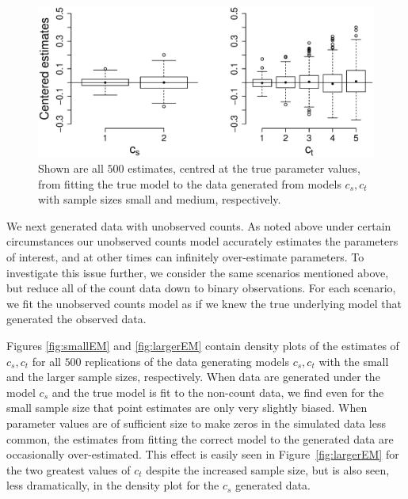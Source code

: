\documentclass[smallextended]{svjour3}
\begin{document}
\begin{figure}
  \centering
  \includegraphics[scale=0.5]{bp}
  \caption{Shown are all $500$ estimates, centred at the true parameter values, from fitting the true model to the data generated from models $c_s,c_t$ with sample sizes small and medium, respectively.}
  \label{fig:bp}
\end{figure}

We next generated data with unobserved counts.  As noted above under certain circumstances our unobserved counts model accurately estimates the parameters of interest, and at other times can infinitely over-estimate parameters.  To investigate this issue further, we consider the same scenarios mentioned above, but reduce all of the count data down to binary observations.  For each scenario, we fit the unobserved counts model as if we knew the true underlying model that generated the observed data.

Figures \ref{fig:smallEM} and \ref{fig:largerEM} contain density plots of the estimates of $c_s, c_t$ for all $500$ replications of the data generating models $c_s,c_t$ with the small and the larger sample sizes, respectively.  When data are generated under the model $c_s$ and the true model is fit to the non-count data, we find even for the small sample size that point estimates are only very slightly biased.  When parameter values are of sufficient size to make zeros in the simulated data less common, the estimates from fitting the correct model to the generated data are occasionally over-estimated.  This effect is easily seen in Figure~\ref{fig:largerEM} for the two greatest values of $c_t$ despite the increased sample size, but is also seen, less dramatically, in the density plot for the $c_s$ generated data.  
\end{document}
